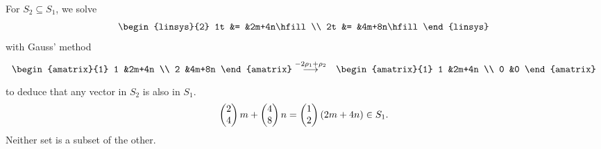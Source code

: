 \begin{exercises}
\begin{answer}
\begin{exparts}
        For \( S_2\subseteq S_1 \), we solve
        \begin{equation*}
          \begin{linsys}{2}
           1t  &=  &2m+4n\hfill  \\
           2t  &=  &4m+8n\hfill  
          \end{linsys}
        \end{equation*}
        with Gauss' method
        \begin{eqnarray*}
          \begin{amatrix}{1}
            1  &2m+4n  \\
            2  &4m+8n
          \end{amatrix}
          &\grstep{-2\rho_1+\rho_2}
          &\begin{amatrix}{1}
            1  &2m+4n  \\
            0  &0
          \end{amatrix}
        \end{eqnarray*}
        to deduce that any vector in \( S_2 \) is also in \( S_1 \).
        \begin{equation*}
          \begin{pmatrix} 2 \\ 4 \end{pmatrix}m
          +\begin{pmatrix} 4 \\ 8 \end{pmatrix}n
          =\begin{pmatrix} 1 \\ 2 \end{pmatrix}(2m+4n)\in S_1.
        \end{equation*}
      \partsitem Neither set is a subset of the other.


\end{exparts}
\end{answer}
\end{exercises}
